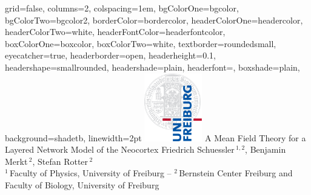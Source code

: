 \documentclass[portrait, final, a0paper, fontscale=0.34, leqno]{baposter}
\begin{document}
\newlength{\leftimgwidth}
\begin{poster}%
  {
  grid=false,
  columns=2,
  colspacing=1em,
  bgColorOne=bgcolor,
  bgColorTwo=bgcolor2,
  borderColor=bordercolor,
  headerColorOne=headercolor,
  headerColorTwo=white, %
  headerFontColor=headerfontcolor,
  boxColorOne=boxcolor,
  boxColorTwo=white,    %
  textborder=roundedsmall,
  eyecatcher=true,
  headerborder=open, 
  headerheight=0.1\textheight,
  headershape=smallrounded,
  headershade=plain,
  headerfont=\Large\textsf, %
  boxshade=plain,
  background=shadetb,
  linewidth=2pt
  }
  {\includegraphics[height=8em]{unisiegel}} %
  {\sf %
    A Mean Field Theory for a \\[0.1cm]
    Layered Network Model of the Neocortex
\vspace{0.3em}}
  {\sf %
      \vspace{0em}\Large{Friedrich Schuessler\,$^{1,2}$, Benjamin Merkt\,$^{2}$, Stefan Rotter\,$^{2}$\\
  \normalsize
  $^1$\,Faculty of Physics, University of Freiburg -- 
  $^2$\,Bernstein Center Freiburg and Faculty of Biology, University of Freiburg 
  }
  }
  {%
  }


\end{poster}
\end{document}
